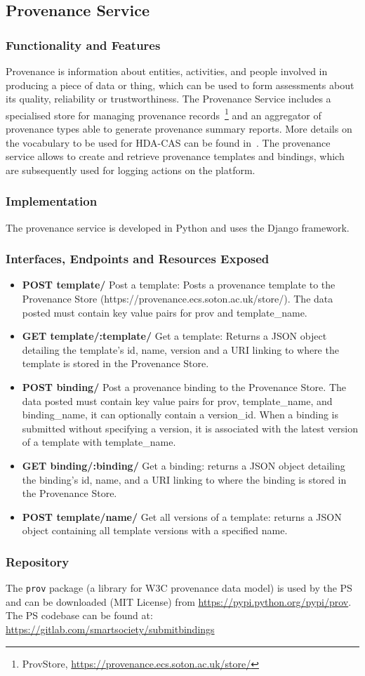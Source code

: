 \subsection{Provenance Service}
\subsubsection{Functionality and Features}
Provenance is information about entities, activities, and people involved in producing a piece of data or thing, which can be used to form assessments about its quality, reliability or trustworthiness. The Provenance Service includes a specialised store for managing provenance records~\footnote{ProvStore, \url{https://provenance.ecs.soton.ac.uk/store/}} and an aggregator of provenance types able to generate provenance summary reports. More details on the vocabulary to be used for HDA-CAS can be found in~\cite{D2.4}. The provenance service allows to create and retrieve provenance templates and bindings, which are subsequently used for logging actions on the platform. 

\subsubsection{Implementation}
The provenance service is developed in Python and uses the Django framework.

\subsubsection{Interfaces, Endpoints and Resources Exposed}
\begin{itemize}
\item {\bf POST template/} Post a template: Posts a provenance template to the Provenance Store (https://provenance.ecs.soton.ac.uk/store/). The data posted must contain key value pairs for prov and template\_name.
\item {\bf GET template/:template/} Get a template: Returns a JSON object detailing the template's id, name, version and a URI linking to where the template is stored in the Provenance Store.
\item {\bf POST binding/} Post a provenance binding to the Provenance Store. The data posted must contain key value pairs for prov, template\_name, and binding\_name, it can optionally contain a version\_id.  When a binding is submitted without specifying a version, it is associated with the latest version of a template with template\_name.
\item {\bf GET binding/:binding/} Get a binding: returns a JSON object detailing the binding's id, name, and a URI linking to where the binding is stored in the Provenance Store.
\item {\bf POST template/name/} Get all versions of a template: returns a JSON object containing all template versions with a specified name.
\end{itemize}

\subsubsection{Repository}
The {\tt prov} package (a library for W3C provenance data model) is used by the PS and can be downloaded (MIT License) from \url{https://pypi.python.org/pypi/prov}.
The PS codebase can be found at: \url{https://gitlab.com/smartsociety/submitbindings}
